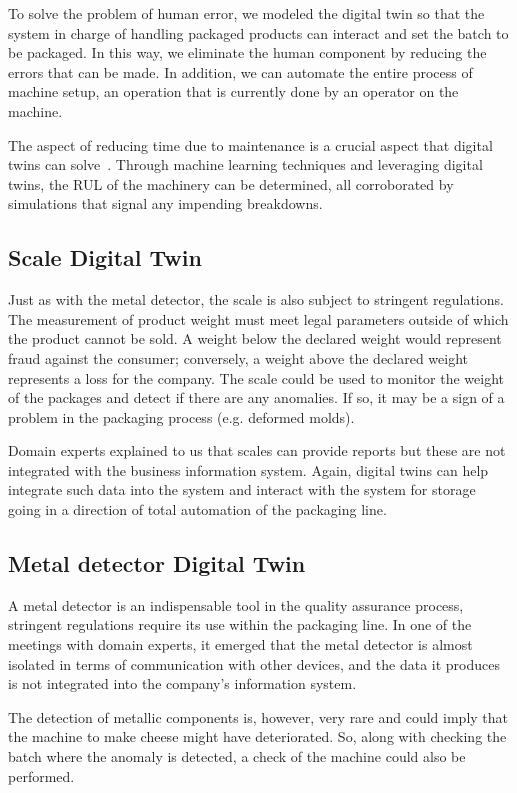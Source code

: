 To solve the problem of human error, we modeled the digital twin so that the system in charge of handling packaged products can interact and set the
batch to be packaged.
In this way, we eliminate the human component by reducing the errors that can be made.
In addition, we can automate the entire process of machine setup, an operation that is currently done by an operator on the machine.

The aspect of reducing time due to maintenance is a crucial aspect that digital twins can solve~\cite{doi:10.1080/0951192X.2019.1686173}.
Through machine learning techniques and leveraging digital twins, the RUL of the machinery can be determined, all corroborated by simulations that
signal any impending breakdowns.

\subsection{Scale Digital Twin}
Just as with the metal detector, the scale is also subject to stringent regulations. The measurement of product weight must meet legal parameters
outside of which the product cannot be sold.
A weight below the declared weight would represent fraud against the consumer; conversely, a weight above the declared weight represents a loss for the company.
The scale could be used to monitor the weight of the packages and detect if there are any anomalies. If so, it may be a sign of a problem in the packaging process (e.g. deformed molds).

Domain experts explained to us that scales can provide reports but these are not integrated with the business information system. Again, digital 
twins can help integrate such data into the system and interact with the system for storage going in a direction of total automation of the packaging
line.

\subsection{Metal detector Digital Twin}
A metal detector is an indispensable tool in the quality assurance process, stringent regulations require its use within the packaging line.
In one of the meetings with domain experts, it emerged that the metal detector is almost isolated in terms of communication with other devices, and
the data it produces is not integrated into the company's information system.

The detection of metallic components is, however, very rare and could imply that the machine to make cheese might have deteriorated. So, along with checking the batch where the anomaly is detected, a check of the machine could also be performed.


